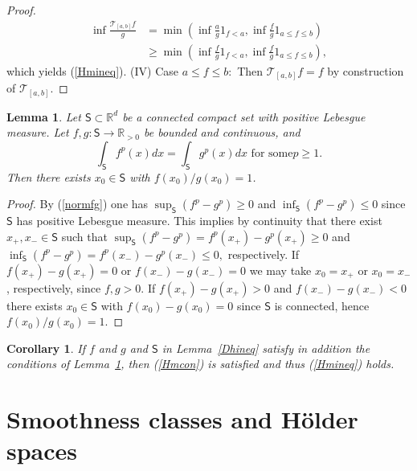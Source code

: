 \documentclass[a4paper,11pt]{amsart}
\theoremstyle{plain}
\newtheorem{lemma}[theorem]{Lemma}
\newtheorem{corollary}[theorem]{Corollary}
\theoremstyle{remark}
\begin{document}
\begin{proof}
\begin{align*}
\inf\frac{\mathcal{T}_{\left[  a,b\right]  }f}{g} &  =\min\left(  \inf\frac
{a}{g}1_{f<a},\inf\frac{f}{g}1_{a\leq f\leq b}\right)  \\
&  \geq\min\left(  \inf\frac{f}{g}1_{f<a},\inf\frac{f}{g}1_{a\leq f\leq
b}\right)  ,
\end{align*}
which yields (\ref{Hmineq}). (IV) Case $a\leq f\leq b:$ Then $\mathcal{T}%
_{\left[  a,b\right]  }f=f$ by construction of $\mathcal{T}_{\left[
a,b\right]  }.$
%
\end{proof}

\begin{lemma}
\label{HmTr1} Let $\mathsf{S}\subset\mathbb{R}^{d}$ be a connected compact set
with positive Lebesgue measure. Let $f,g:\mathsf{S}\rightarrow\mathbb{R}_{>0}$
be bounded and continuous, and
\begin{equation}
\int_{\mathsf{S}}f^{p}(x)dx=\int_{\mathsf{S}}g^{p}(x)dx\text{ \ for some
}p\geq1.\label{normfg}%
\end{equation}
Then there exists $x_{0}\in\mathsf{S}$ with $f(x_{0})/g(x_{0})=1$.
\end{lemma}

\begin{proof}
By (\ref{normfg}) one has $\sup_{\mathsf{S}}\left(  f^{p}-g^{p}\right)  \geq0$
and $\inf_{\mathsf{S}}\left(  f^{p}-g^{p}\right)  \leq0$ since $\mathsf{S}$
has positive Lebesgue measure. This implies by continuity that there exist
$x_{+},x_{-}\in\mathsf{S}$ such that $\sup_{\mathsf{S}}\left(  f^{p}%
-g^{p}\right)  =f^p(x_{+})-g^p(x_{+})\geq0$ and $\inf_{\mathsf{S}}\left(
f^{p}-g^{p}\right)  =f^p(x_{-})-g^p(x_{-})\leq0,$ respectively. If $f(x_{+}%
)-g(x_{+})=0$ or $f(x_{-})-g(x_{-})=0$ we may take $x_{0}=x_{+}$ or
$x_{0}=x_{-}$, respectively,  since $f,g>0.$ If $f(x_{+})-g(x_{+})>0$ and $f(x_{-}%
)-g(x_{-})<0$ there exists $x_{0}\in\mathsf{S}$ with $f(x_{0})-g(x_{0})=0$
since $\mathsf{S}$ is connected, hence $f(x_{0})/g(x_{0})=1.$
\end{proof}

\begin{corollary}\label{HmTr}
If $f$ and $g$ and $\mathsf{S}$ in Lemma~\ref{Dhineq} satisfy in addition the conditions of Lemma~\ref{HmTr1}, then (\ref{Hmcon}) is satisfied and thus (\ref{Hmineq}) holds.
\end{corollary}



\section{Smoothness classes and H\"{o}lder spaces}\label{SmoothC}
\end{document}
